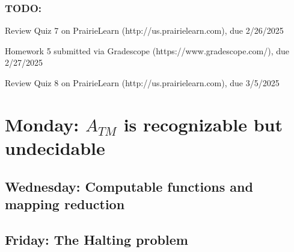 \vspace{-20pt}

\subsubsection*{TODO:}
\begin{list}{\itemsep-10pt}
   \item Review Quiz 7 on PrairieLearn (http://us.prairielearn.com), due 2/26/2025
   \item Homework 5 submitted via Gradescope (https://www.gradescope.com/), due 2/27/2025
   \item Review Quiz 8 on PrairieLearn (http://us.prairielearn.com), due 3/5/2025
\end{list}

\newpage

\section*{Monday: $A_{TM}$ is recognizable but undecidable}


    
\newpage
\subsection*{Wednesday: Computable functions and mapping reduction}




\newpage
\subsection*{Friday: The Halting problem}




